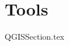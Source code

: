 \documentclass[class=book , crop=false]{standalone}
\begin{document}
\chapter{Tools}

{QGISSection.tex}
\end{document}
